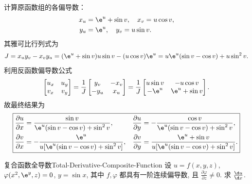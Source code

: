 \begin{solution}
    计算原函数组的各偏导数：
    \begin{equation}
        \begin{aligned}
            x_u & = \e^u + \sin v, \quad x_v = u \cos v, \\
            y_u & = \e^u, \quad y_v = u \sin v.
        \end{aligned}
    \end{equation}
    其雅可比行列式为
    \begin{equation}
        J = x_u y_v - x_v y_u = (\e^u + \sin v)u \sin v - (u \cos v)\e^u = u \e^u (\sin v - \cos v) + u \sin^2 v.
    \end{equation}
    利用反函数偏导数公式
    \begin{equation}
        \begin{bmatrix}
            u_x & u_y \\
            v_x & v_y
        \end{bmatrix} = \frac{1}{J}
        \begin{bmatrix}
            y_v  & -x_v \\
            -y_u & x_u
        \end{bmatrix} = \frac{1}{J}
        \begin{bmatrix}
            u \sin v & -u \cos v     \\
            -\e^u    & \e^u + \sin v
        \end{bmatrix}.
    \end{equation}
    故最终结果为
    \begin{equation}
        \boxed{
            \begin{aligned}
                \frac{\partial u}{\partial x} & = \frac{\sin v}{\e^u (\sin v - \cos v) + \sin^2 v},   & \frac{\partial u}{\partial y} & = -\frac{\cos v}{\e^u (\sin v - \cos v) + \sin^2 v},          \\
                \frac{\partial v}{\partial x} & = -\frac{\e^u}{u[\e^u (\sin v - \cos v) + \sin^2 v]}, & \frac{\partial v}{\partial y} & = \frac{\e^u + \sin v}{u[\e^u (\sin v - \cos v) + \sin^2 v]}.
            \end{aligned}
        }
    \end{equation}
\end{solution}


\begin{problem}{复合函数全导数}{Total-Derivative-Composite-Function}
    设 $u = f(x, y, z)$, $\varphi(x^2, \e^y, z) = 0$, $y = \sin x$, 其中 $f, \varphi$ 都具有一阶连续偏导数, 且 $\frac{\partial \varphi}{\partial z} \neq 0$. 求 $\frac{\d u}{\d x}$.
\end{problem}

